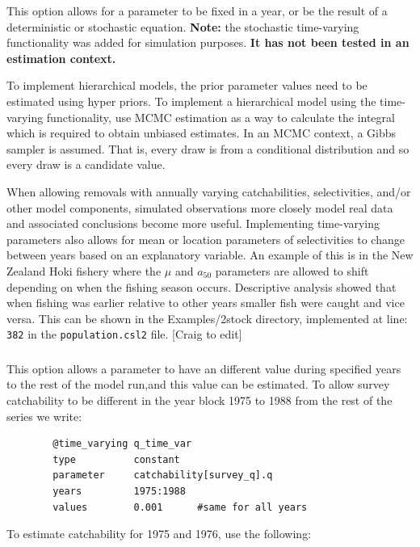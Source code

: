 This option allows for a parameter to be fixed in a year, or be the result of a deterministic or stochastic equation. \textbf{Note:} the stochastic time-varying functionality was added for simulation purposes. \textbf{It has not been tested in an estimation context.}

To implement hierarchical models, the prior parameter values need to be estimated using hyper priors. To implement a hierarchical model using the time-varying functionality, use MCMC estimation as a way to calculate the integral which is required to obtain unbiased estimates. In an MCMC context, a Gibbs sampler is assumed. That is, every draw is from a conditional distribution and so every draw is a candidate value. 

When allowing removals with annually varying catchabilities, selectivities, and/or other model components, simulated observations more closely model real data and associated conclusions become more useful. Implementing time-varying parameters also allows for mean or location parameters of selectivities to change between years based on an explanatory variable. An example of this is in the New Zealand Hoki fishery where the $\mu$ and $a_{50}$ parameters are allowed to shift depending on when the fishing season occurs. Descriptive analysis showed that when fishing was earlier relative to other years smaller fish were caught and vice versa. This can be shown in the Examples/2stock directory, implemented at line: \texttt{382} in the \texttt{population.csl2} file. [Craig to edit]

\subsubsection[Constant (year blocks)]{}\label{sec:TimeVarying-Constant}

This option allows a parameter to have an different value during specified years to the rest of the model run,and this value can be estimated. To allow survey catchability to be different in the year block 1975 to 1988 from the rest of the series we write:

{\small{\begin{verbatim}
		@time_varying q_time_var
		type          constant
		parameter     catchability[survey_q].q
		years         1975:1988
		values        0.001      #same for all years
		\end{verbatim}}}

To estimate catchability for 1975 and 1976, use the following:

